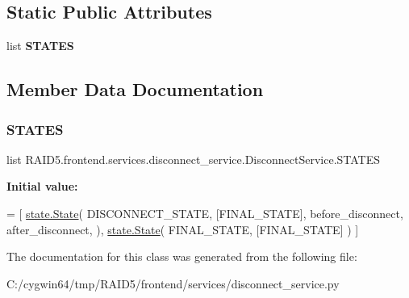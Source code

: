 \subsection*{Static Public Attributes}
\begin{DoxyCompactItemize}
\item 
list {\bfseries S\+T\+A\+T\+ES}
\end{DoxyCompactItemize}


\subsection{Member Data Documentation}
\mbox{\label{class_r_a_i_d5_1_1frontend_1_1services_1_1disconnect__service_1_1_disconnect_service_ac934d9262340d5c3da0a913ac2a6f656}} 
\subsubsection{\texorpdfstring{S\+T\+A\+T\+ES}{STATES}}
{\footnotesize\ttfamily list R\+A\+I\+D5.\+frontend.\+services.\+disconnect\+\_\+service.\+Disconnect\+Service.\+S\+T\+A\+T\+ES\hspace{0.3cm}{\ttfamily [static]}}

{\bfseries Initial value\+:}
\begin{DoxyCode}
=  [
        \hyperlink{classstate_1_1_state}{state.State}(
            DISCONNECT\_STATE,
            [FINAL\_STATE],
            before\_disconnect,
            after\_disconnect,
        ),
        \hyperlink{classstate_1_1_state}{state.State}(
            FINAL\_STATE,
            [FINAL\_STATE]
        )
    ]
\end{DoxyCode}


The documentation for this class was generated from the following file\+:\begin{DoxyCompactItemize}
\item 
C\+:/cygwin64/tmp/\+R\+A\+I\+D5/frontend/services/disconnect\+\_\+service.\+py\end{DoxyCompactItemize}
